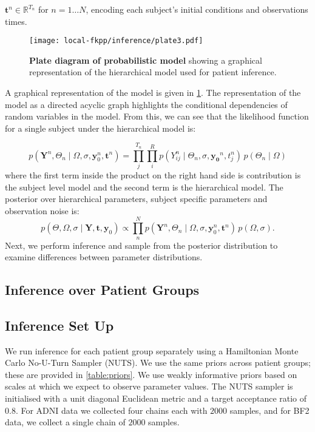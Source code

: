 $\mathbf{t}^{n} \in \mathbb{R}^{T_{n}}$ for $n = 1 \hdots N$, encoding each
subject's initial conditions and observations times.
\begin{figure}[H]
    \centering
    \texttt{[image: local-fkpp/inference/plate3.pdf]}
    \caption{\textbf{Plate diagram of probabilistic model} showing a graphical
    representation of the hierarchical model used for patient inference.}
    \label{fig:plate}
\end{figure}
A graphical representation of the model is given in \cref{fig:plate}. The
representation of the model as a directed acyclic graph highlights the
conditional dependencies of random variables in the model. From this, we can see
that the likelihood function for a single subject under the hierarchical model
is: 

\begin{equation}
    p(\mathbf{Y}^{n}, \Theta_n \mid \Omega, \sigma, \mathbf{y}_{0}^{n}, \mathbf{t}^{n}) = 
    \prod_j^{T_{n}} \prod_i^R p(Y^{n}_{ij} \mid \Theta_n, \sigma, \mathbf{y_0}^n, t^n_j)
    \,p(\Theta_n \mid \Omega)
\end{equation}
where the first term inside the product on the right hand side is contribution
is the subject level model and the second term is the hierarchical model. The
posterior over hierarchical parameters, subject specific parameters and
observation noise is: 
\begin{equation}
    p(\Theta, \Omega, \sigma \mid \mathbf{Y}, \mathbf{t}, \mathbf{y}_{0})  \propto
    \prod_n^N
    p(\mathbf{Y}^{n}, \Theta_n \mid \Omega, \sigma, \mathbf{y}_{0}^{n}, \mathbf{t}^{n})
    \,p(\Omega, \sigma).
\end{equation}
Next, we perform inference and sample from the posterior distribution to examine 
differences between parameter distributions.


\subsection{Inference over Patient Groups}

\subsection*{Inference Set Up}

We run inference for each patient group separately using a Hamiltonian Monte 
Carlo No-U-Turn Sampler (NUTS). We use the same priors across patient groups; 
these are provided in \cref{table:priors}. We use weakly informative 
priors based on scales at which 
we expect to observe parameter values. The NUTS
sampler is initialised with a unit diagonal Euclidean metric and a target
acceptance ratio of $0.8$. For ADNI data we collected four chains
each with $2000$ samples, and for BF2 data, we collect a single chain of $2000$ 
samples.


